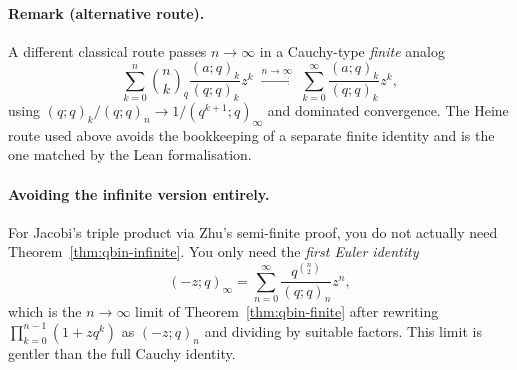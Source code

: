 \paragraph{Remark (alternative route).} A different classical route passes
$n \to \infty$ in a Cauchy-type \emph{finite} analog
\[
  \sum_{k=0}^n \binom{n}{k}_q \frac{(a;q)_k}{(q;q)_k} z^k
  \;\xrightarrow{n \to \infty}\;
  \sum_{k=0}^\infty \frac{(a;q)_k}{(q;q)_k} z^k,
\]
using $(q;q)_k / (q;q)_n \to 1/(q^{k+1};q)_\infty$ and dominated convergence.
The Heine route used above avoids the bookkeeping of a separate finite identity
and is the one matched by the Lean formalisation.

\paragraph{Avoiding the infinite version entirely.}
For Jacobi's triple product via Zhu's semi-finite proof, you do not actually need Theorem~\ref{thm:qbin-infinite}. You only need the \emph{first Euler identity}
\[
(-z; q)_\infty = \sum_{n=0}^\infty \frac{q^{\binom{n}{2}}}{(q; q)_n} z^n,
\]
which is the $n \to \infty$ limit of Theorem~\ref{thm:qbin-finite} after rewriting $\prod_{k=0}^{n-1}(1 + zq^k)$ as $(-z; q)_n$ and dividing by suitable factors. This limit is gentler than the full Cauchy identity.



